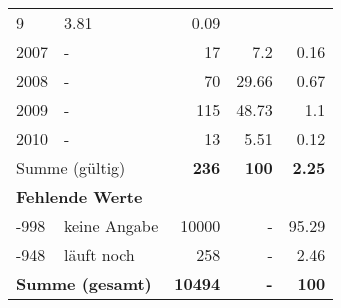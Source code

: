 \begin{longtable}{lXrrr}
       \num{9} &
       \num[round-mode=places,round-precision=2]{3,81} &
         \num[round-mode=places,round-precision=2]{0,09} \\

     2007 &
     \multicolumn{1}{X}{ -  } &


       \num{17} &
       \num[round-mode=places,round-precision=2]{7,2} &
         \num[round-mode=places,round-precision=2]{0,16} \\

     2008 &
     \multicolumn{1}{X}{ -  } &


       \num{70} &
       \num[round-mode=places,round-precision=2]{29,66} &
         \num[round-mode=places,round-precision=2]{0,67} \\

     2009 &
     \multicolumn{1}{X}{ -  } &


       \num{115} &
       \num[round-mode=places,round-precision=2]{48,73} &
         \num[round-mode=places,round-precision=2]{1,1} \\

     2010 &
     \multicolumn{1}{X}{ -  } &


       \num{13} &
       \num[round-mode=places,round-precision=2]{5,51} &
         \num[round-mode=places,round-precision=2]{0,12} \\
     \midrule
     \multicolumn{2}{l}{Summe (gültig)} &
       \textbf{\num{236}} &
     \textbf{100} &
       \textbf{\num[round-mode=places,round-precision=2]{2,25}} \\
     \multicolumn{5}{l}{\textbf{Fehlende Werte}}\\
       -998 &
       keine Angabe &
         \num{10000} &
        - &
         \num[round-mode=places,round-precision=2]{95,29} \\
       -948 &
       läuft noch &
         \num{258} &
        - &
         \num[round-mode=places,round-precision=2]{2,46} \\
     \midrule
     \multicolumn{2}{l}{\textbf{Summe (gesamt)}} &
          \textbf{\num{10494}} &
        \textbf{-} &
        \textbf{100} \\
     \bottomrule
     \end{longtable}
     
